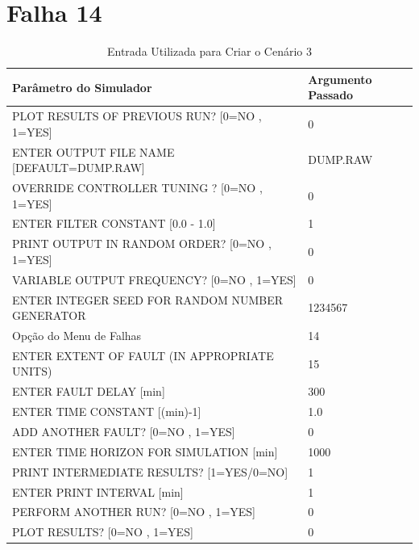 \documentclass[journal]{IEEEtran}
\begin{document}
\clearpage
\section*{Falha 14}

\begin{table}[H]
	\centering
	\normalsize
	\begin{tabular}{|l|l|}
		\hline
		Parâmetro do Simulador											 		& Argumento Passado \\
		\hline\hline
		PLOT RESULTS OF PREVIOUS RUN? [0=NO , 1=YES] 		& 0 				\\ \hline
		ENTER OUTPUT FILE NAME [DEFAULT=DUMP.RAW] 			& DUMP.RAW	\\ \hline
		OVERRIDE CONTROLLER TUNING ? [0=NO , 1=YES] 		& 0 				\\ \hline
		ENTER FILTER CONSTANT [0.0 - 1.0]								& 1 				\\ \hline
		PRINT OUTPUT IN RANDOM ORDER? [0=NO , 1=YES]		& 0 				\\ \hline
		VARIABLE OUTPUT FREQUENCY? [0=NO , 1=YES]				& 0 				\\ \hline
		ENTER INTEGER SEED FOR RANDOM NUMBER GENERATOR	& 1234567		\\ \hline
		Opção do Menu de Falhas		 											& 14 				\\ \hline
		ENTER EXTENT OF FAULT (IN APPROPRIATE UNITS) 		& 15				\\ \hline
		ENTER FAULT DELAY [min]													& 300				\\ \hline
		ENTER TIME CONSTANT [(min)-1]										& 1.0				\\ \hline
		ADD ANOTHER FAULT? [0=NO , 1=YES]								& 0 				\\ \hline
		ENTER TIME HORIZON FOR SIMULATION [min]  				& 1000			\\ \hline
		PRINT INTERMEDIATE RESULTS? [1=YES/0=NO] 				& 1 				\\ \hline
		ENTER PRINT INTERVAL [min]						  				& 1 				\\ \hline
		PERFORM ANOTHER RUN? [0=NO , 1=YES] 	  				& 0 				\\ \hline
		PLOT RESULTS? [0=NO , 1=YES] 					  				& 0 				\\ \hline
	\end{tabular}
	\caption{Entrada Utilizada para Criar o Cenário 3}
\end{table}
\end{document}

